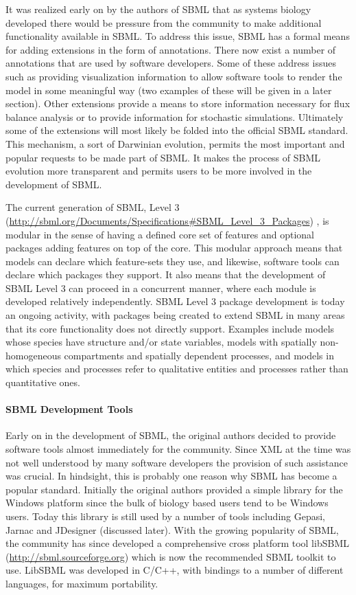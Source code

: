 \documentclass[]{article}
\begin{document}
It was realized early on by the authors of SBML that as systems biology
developed there would be pressure from the community to make additional
functionality available in SBML. To address this issue, SBML has a
formal means for adding extensions in the form of annotations. There now
exist a number of annotations that are used by software developers. Some
of these address issues such as providing visualization information to
allow software tools to render the model in some meaningful way (two
examples of these will be given in a later section). Other extensions
provide a means to store information necessary for flux balance analysis
or to provide information for stochastic simulations. Ultimately some of
the extensions will most likely be folded into the official SBML
standard. This mechanism, a sort of Darwinian evolution, permits the
most important and popular requests to be made part of SBML. It makes
the process of SBML evolution more transparent and permits users to be
more involved in the development of SBML.

The current generation of SBML, Level 3
(\url{http://sbml.org/Documents/Specifications#SBML_Level_3_Packages})
\autocite{hucka2010systems}, is modular in the sense of having a defined
core set of features and optional packages adding features on top of the
core. This modular approach means that models can declare which
feature-sets they use, and likewise, software tools can declare which
packages they support. It also means that the development of SBML Level
3 can proceed in a concurrent manner, where each module is developed
relatively independently. SBML Level 3 package development is today an
ongoing activity, with packages being created to extend SBML in many
areas that its core functionality does not directly support. Examples
include models whose species have structure and/or state variables,
models with spatially non-homogeneous compartments and spatially
dependent processes, and models in which species and processes refer to
qualitative entities and processes rather than quantitative ones.

\paragraph{SBML Development Tools \label{libsbml}}

Early on in the development of SBML, the original authors decided to
provide software tools almost immediately for the community. Since XML
at the time was not well understood by many software developers the
provision of such assistance was crucial. In hindsight, this is probably
one reason why SBML has become a popular standard. Initially the
original authors provided a simple library for the Windows platform
since the bulk of biology based users tend to be Windows users. Today
this library is still used by a number of tools including Gepasi, Jarnac
and JDesigner (discussed later). With the growing popularity of SBML,
the community has since developed a comprehensive cross platform tool
libSBML (\url{http://sbml.sourceforge.org}) which is now the recommended
SBML toolkit to use. LibSBML was developed in C/C++, with bindings to a
number of different languages, for maximum portability.
\end{document}
